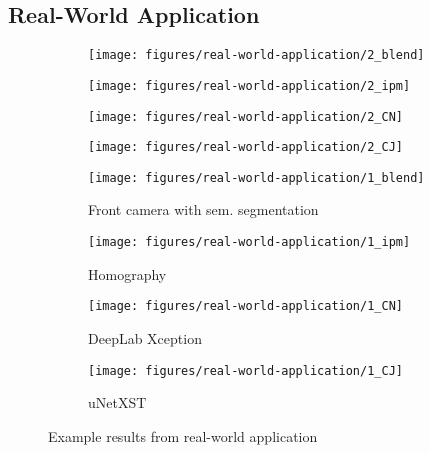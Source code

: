 \documentclass[a4paper, 10pt, conference]{ieeeconf}
\begin{document}
\subsection{Real-World Application}

\begin{figure*}[!t]
  \begin{subfigure}[b]{0.2425\textwidth}
    \texttt{[image: figures/real-world-application/2\_blend]}
  \end{subfigure}
  \hfill
  \begin{subfigure}[b]{0.2425\textwidth}
    \texttt{[image: figures/real-world-application/2\_ipm]}
  \end{subfigure}
  \hfill
  \begin{subfigure}[b]{0.2425\textwidth}
    \texttt{[image: figures/real-world-application/2\_CN]}
  \end{subfigure}
  \hfill
  \begin{subfigure}[b]{0.2425\textwidth}
    \texttt{[image: figures/real-world-application/2\_CJ]}
  \end{subfigure}

  \vspace{0.5\baselineskip}
  \captionsetup[subfigure]{skip=2pt}
  \begin{subfigure}[b]{0.2425\textwidth}
    \texttt{[image: figures/real-world-application/1\_blend]}
    \caption*{Front camera with sem. segmentation}
  \end{subfigure}
  \hfill
  \begin{subfigure}[b]{0.2425\textwidth}
    \texttt{[image: figures/real-world-application/1\_ipm]}
    \caption*{Homography}
  \end{subfigure}
  \hfill
  \begin{subfigure}[b]{0.2425\textwidth}
    \texttt{[image: figures/real-world-application/1\_CN]}
    \caption*{DeepLab Xception}
  \end{subfigure}
  \hfill
  \begin{subfigure}[b]{0.2425\textwidth}
    \texttt{[image: figures/real-world-application/1\_CJ]}
    \caption*{uNetXST}
  \end{subfigure}\caption{Example results from real-world application}
  \label{fig:RealWorldApplication}
\end{figure*}
\end{document}
